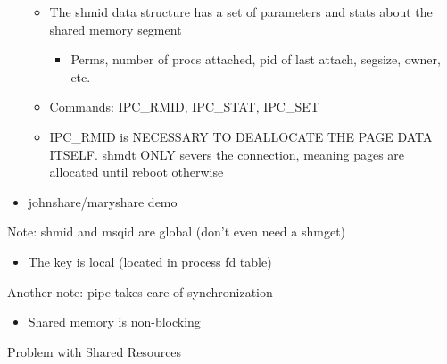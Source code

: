\begin{itemize}
\begin{itemize}
        \item The shmid data structure has a set of parameters and stats about the shared memory segment
        \begin{itemize}
            \item Perms, number of procs attached, pid of last attach, segsize, owner, etc.
        \end{itemize}
        \item Commands: IPC\_RMID, IPC\_STAT, IPC\_SET
        \item IPC\_RMID is NECESSARY TO DEALLOCATE THE PAGE DATA ITSELF. shmdt ONLY severs the connection, meaning pages are allocated until reboot otherwise
    \end{itemize}
    \item johnshare/maryshare demo
\end{itemize}
Note: shmid and msqid are global (don't even need a shmget)
\begin{itemize}
    \item The key is local (located in process fd table)
\end{itemize}
Another note: pipe takes care of synchronization
\begin{itemize}
    \item Shared memory is non-blocking
\end{itemize}
Problem with Shared Resources
